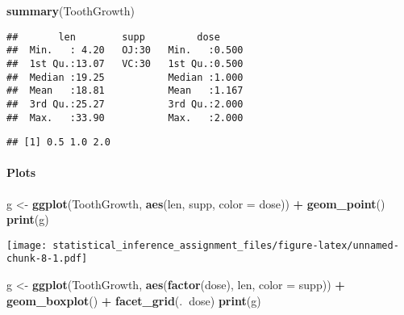 \documentclass[]{article}
\newenvironment{Shaded}{\begin{snugshade}}{\end{snugshade}}
\newcommand{\KeywordTok}[1]{\textcolor[rgb]{0.13,0.29,0.53}{\textbf{#1}}}
\newcommand{\DataTypeTok}[1]{\textcolor[rgb]{0.13,0.29,0.53}{#1}}
\newcommand{\StringTok}[1]{\textcolor[rgb]{0.31,0.60,0.02}{#1}}
\newcommand{\OperatorTok}[1]{\textcolor[rgb]{0.81,0.36,0.00}{\textbf{#1}}}
\newcommand{\NormalTok}[1]{#1}
\let\oldparagraph\paragraph
\renewcommand{\paragraph}[1]{\oldparagraph{#1}\mbox{}}
\begin{document}
\begin{Shaded}
\begin{Highlighting}[]
\KeywordTok{summary}\NormalTok{(ToothGrowth)}
\end{Highlighting}
\end{Shaded}

\begin{verbatim}
##       len        supp         dose      
##  Min.   : 4.20   OJ:30   Min.   :0.500  
##  1st Qu.:13.07   VC:30   1st Qu.:0.500  
##  Median :19.25           Median :1.000  
##  Mean   :18.81           Mean   :1.167  
##  3rd Qu.:25.27           3rd Qu.:2.000  
##  Max.   :33.90           Max.   :2.000
\end{verbatim}

\begin{Shaded}
\end{Shaded}

\begin{verbatim}
## [1] 0.5 1.0 2.0
\end{verbatim}

\paragraph{Plots}\label{plots}

\begin{Shaded}
\begin{Highlighting}[]
\NormalTok{g <-}\StringTok{ }\KeywordTok{ggplot}\NormalTok{(ToothGrowth, }\KeywordTok{aes}\NormalTok{(len, supp, }\DataTypeTok{color =}\NormalTok{ dose)) }\OperatorTok{+}\StringTok{ }\KeywordTok{geom_point}\NormalTok{()}
\KeywordTok{print}\NormalTok{(g)}
\end{Highlighting}
\end{Shaded}

\texttt{[image: statistical\_inference\_assignment\_files/figure-latex/unnamed-chunk-8-1.pdf]}

\begin{Shaded}
\begin{Highlighting}[]
\NormalTok{g <-}\StringTok{ }\KeywordTok{ggplot}\NormalTok{(ToothGrowth, }\KeywordTok{aes}\NormalTok{(}\KeywordTok{factor}\NormalTok{(dose), len, }\DataTypeTok{color =}\NormalTok{ supp)) }\OperatorTok{+}\StringTok{ }\KeywordTok{geom_boxplot}\NormalTok{() }\OperatorTok{+}\StringTok{ }\KeywordTok{facet_grid}\NormalTok{(.}\OperatorTok{~}\NormalTok{dose)}
\KeywordTok{print}\NormalTok{(g)}
\end{Highlighting}
\end{Shaded}
\end{document}
